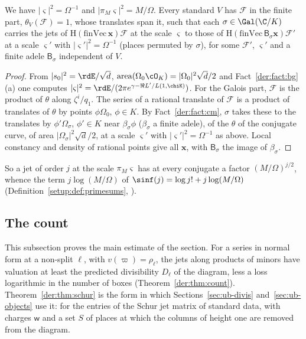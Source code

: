 \begin{proposition}\label{der:prop:scale}
We have $|\varsigma|^2=\Omega^{-1}$ and $|\pi_M\varsigma|^2=M/\Omega$. Every standard $V$ has
$\mathcal F$ in the finite part, $\theta_V(\mathcal F)=1$, whose translates span it, such that each
$\sigma\in\Gal(\C/K)$ carries the jets of $\mathrm H(\mathrm{finVec}\,\mathbf x)\mathcal F$ at the
scale $\varsigma$ to those of $\mathrm H(\mathrm{finVec}\,\mathsf B_\sigma\mathbf x)\mathcal F'$ at a
scale $\varsigma'$ with $|\varsigma'|^2=\Omega^{-1}$ (places permuted by $\sigma$), for some
$\mathcal F'$, $\varsigma'$ and a finite adele $\mathsf B_\sigma$ independent of $V$.
\end{proposition}

\begin{proof}
From $|s_0|^2=\rdE/\sqrt d$, $\operatorname{area}(\Omega_0\cO_K)=|\Omega_0|^2\sqrt d/2$ and
Fact~\ref{der:fact:bg}(a) one computes $|\varsigma|^2=\rdE/(2\pi e^{\gamma-\Re L'/L(1,\chiK)})$.
For the Galois part, $\mathcal F$ is the product of $\theta$ along $\zeta^i/q_1$. The series of a
rational translate of $\mathcal F$ is a product of translates of $\theta$ by points $\phi\Omega_0$,
$\phi\in K$. By Fact~\ref{der:fact:cm}, $\sigma$ takes these to the translates by $\phi'\Omega_\sigma$,
$\phi'\in K$ near $\beta_\sigma\phi$ ($\beta_\sigma$ a finite adele), of the $\theta$ of the conjugate
curve, of area $|\Omega_\sigma|^2\sqrt d/2$, at a scale $\varsigma'$ with $|\varsigma'|^2=\Omega^{-1}$
as above. Local constancy and density of rational points give all $\mathbf x$, with $\mathsf B_\sigma$
the image of $\beta_\sigma$.
\end{proof}

So a jet of order $j$ at the scale $\pi_M\varsigma$ has at every conjugate a factor $(M/\Omega)^{j/2}$,
whence the term $j\log(M/\Omega)$ of $\sinf(j)=\log j!+j\log(M/\Omega)$
(Definition~\ref{setup:def:primesums}, ).

\subsection{The count}\label{der:sec:count}

This subsection proves the main estimate of the section. For a series in normal form at a
non-split $\ell$, with $v(\varpi)=\rho_\ell$, the jets
along products of minors have valuation at least the predicted divisibility $D_\ell$ of the
diagram, less a loss logarithmic in the number of boxes (Theorem~\ref{der:thm:count}).
Theorem~\ref{der:thm:schur} is the form in which Sections~\ref{sec:ub-divis}
and~\ref{sec:ub-objects} use it: for the entries of the Schur jet matrix of standard data, with
charges $\mathsf w$ and a set $S$ of places at which the columns of height one are removed from the
diagram.

